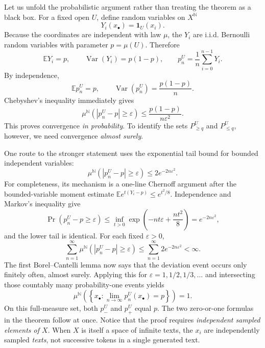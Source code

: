 Let us unfold the probabilistic argument rather than treating the theorem as a black box. For a fixed open \(U\), define random variables on \(X^{\mathbb N}\)
\[
 Y_i(x_\bullet)=\mathbf1_U(x_i).
\]
Because the coordinates are independent with law \(\mu\), the \(Y_i\) are i.i.d. Bernoulli random variables with parameter \(p=\mu(U)\). Therefore
\[
 \mathbb E Y_i=p,\qquad
 \operatorname{Var}(Y_i)=p(1-p),
 \qquad
 p_n^U=\frac1n\sum_{i=0}^{n-1}Y_i.
\]
By independence,
\begin{equation}
 \mathbb E p_n^U=p,\qquad
 \operatorname{Var}(p_n^U)=\frac{p(1-p)}n.
 \label{eq:N20261026-frequency-variance}
\end{equation}
Chebyshev's inequality immediately gives
\[
 \mu^{\mathbb N}(|p_n^U-p|\geq\varepsilon)
 \leq\frac{p(1-p)}{n\varepsilon^2}.
\]
This proves convergence \emph{in probability}. To identify the sets \(P_{\geq q}^U\) and \(P_{\leq q}^U\), however, we need convergence \emph{almost surely}.

One route to the stronger statement uses the exponential tail bound for bounded independent variables:
\begin{equation}
 \mu^{\mathbb N}(|p_n^U-p|\geq\varepsilon)
 \leq 2e^{-2n\varepsilon^2}.
 \label{eq:N20261026-hoeffding}
\end{equation}
For completeness, its mechanism is a one-line Chernoff argument after the bounded-variable moment estimate
\(\mathbb E e^{t(Y_i-p)}\leq e^{t^2/8}\). Independence and Markov's inequality give
\[
 \Pr(p_n^U-p\geq\varepsilon)
 \leq\inf_{t>0}
 \exp\left(-nt\varepsilon+\frac{nt^2}{8}\right)
 =e^{-2n\varepsilon^2},
\]
and the lower tail is identical. For each fixed \(\varepsilon>0\),
\[
 \sum_{n=1}^{\infty}\mu^{\mathbb N}(|p_n^U-p|\geq\varepsilon)
 \leq\sum_{n=1}^{\infty}2e^{-2n\varepsilon^2}<\infty.
\]
The first Borel--Cantelli lemma now says that the deviation event occurs only finitely often, almost surely. Applying this for \(\varepsilon=1,1/2,1/3,\ldots\) and intersecting those countably many probability-one events yields
\begin{equation}
 \mu^{\mathbb N}\left(
 \left\{x_\bullet:\lim_{n\to\infty}p_n^U(x_\bullet)=p\right\}
 \right)=1.
 \label{eq:N20261026-strong-LLN}
\end{equation}
On this full-measure set, both \(p_-^U\) and \(p_+^U\) equal \(p\). The two zero-or-one formulas in the theorem follow at once. Notice that the proof requires \emph{independent sampled elements of \(X\)}. When \(X\) is itself a space of infinite texts, the \(x_i\) are independently sampled \emph{texts}, not successive tokens in a single generated text.

